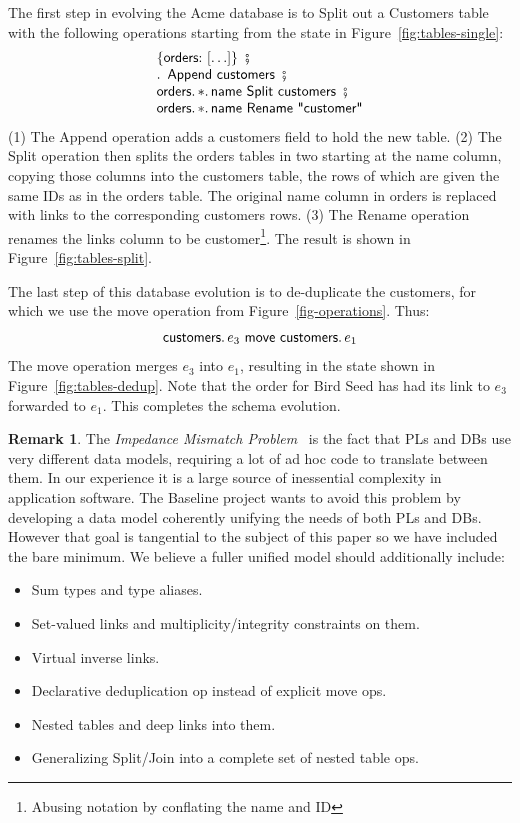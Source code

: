 \documentclass[english,submission]{programming}
\theoremstyle{definition}
\newtheorem*{remark}{Remark}
\DeclareMathOperator{\exec}{\ \fatsemi\ \ }
\newcommand{\is}{{:}\ }
\newcommand{\quotedstring}[1]{\textsf{\textquotedbl{#1}\textquotedbl}}
\begin{document}
The first step in evolving the Acme database is to \textsf{Split} out a \textsf{Customers} table with the following operations starting from the state in Figure~\ref{fig:tables-single}:
\[
\begin{array}{l}
\{ \textsf{orders}\is [ \ldots ]\} \exec\\
\ldotp \textsf{ Append } \textsf{customers} \exec \\
\textsf{orders}\ldotp * \ldotp \textsf{name Split customers} \exec \\
\textsf{orders}\ldotp * \ldotp \textsf{name Rename } \quotedstring{customer}
\end{array}\]
(1) The \textsf{Append} operation adds a \textsf{customers} field to hold the new table. (2) The \textsf{Split} operation then splits the \textsf{orders} tables in two starting at the \textsf{name} column, copying those columns into the \textsf{customers} table, the rows of which are given the same IDs as in the \textsf{orders} table.
The original \textsf{name} column in \textsf{orders} is replaced with links to the corresponding \textsf{customers} rows.
(3) The \textsf{Rename} operation renames the links column to be \textsf{customer}\footnote{Abusing notation by conflating the name and ID}.
The result is shown in Figure~\ref{fig:tables-split}.

The last step of this database evolution is to de-duplicate the customers, for which we use the \textsf{move} operation from Figure~\ref{fig-operations}. Thus:
\[
\textsf{customers}\ldotp e_3 \textsf{ move } \textsf{customers}\ldotp e_1
\]
The \textsf{move} operation merges $e_3$ into $e_1$, resulting in the state shown in  Figure~\ref{fig:tables-dedup}. Note that the order for Bird Seed has had its link to $e_3$ forwarded to $e_1$. This completes the schema evolution.

\begin{remark}
  The \textit{Impedance Mismatch Problem}~\cite{Chen1996} is the fact that PLs and DBs use very different data models, requiring a lot of ad hoc code to translate between them. In our experience it is a large source of inessential complexity in application software. The Baseline project wants to avoid this problem by developing a data model coherently unifying the needs of both PLs and DBs. However that goal is tangential to the subject of this paper so we have included the bare minimum. We believe a fuller unified model should additionally include:
  \begin{itemize}
    \item Sum types and type aliases.
    \item Set-valued links and multiplicity/integrity constraints on them.
    \item Virtual inverse links.
    \item Declarative deduplication op instead of explicit \textsf{move} ops.
    \item Nested tables and deep links into them.
    \item Generalizing Split/Join into a complete set of nested table ops.
  \end{itemize}
\end{remark}
\end{document}
